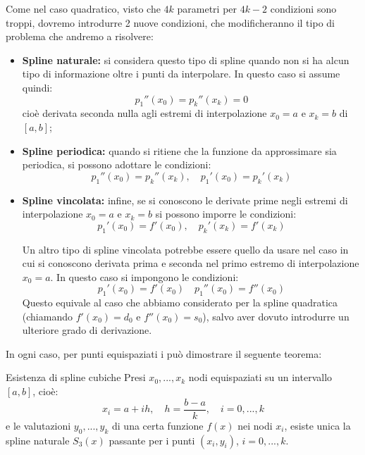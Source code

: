 \documentclass[a4paper,11pt]{article}
\begin{document}
Come nel caso quadratico, visto che $4k$ parametri per $4k - 2$ condizioni sono troppi, dovremo introdurre 2 nuove condizioni, che modificheranno il tipo di problema che andremo a risolvere:
\begin{itemize}
	\item \textbf{Spline naturale:} si considera questo tipo di spline quando non si ha alcun tipo di informazione oltre i punti da interpolare. In questo caso si assume quindi:
		$$
		p_1''(x_0) = p_k''(x_k) = 0
		$$
		cioè derivata seconda nulla agli estremi di interpolazione $x_0 = a$ e $x_k = b$ di $[a, b]$;
	\item \textbf{Spline periodica:} quando si ritiene che la funzione da approssimare sia periodica, si possono adottare le condizioni:
		$$
		p_1''(x_0) = p_k''(x_k), \quad p_1'(x_0) = p_k'(x_k)
		$$
	\item \textbf{Spline vincolata:} infine, se si conoscono le derivate prime negli estremi di interpolazione $x_0 = a$ e $x_k = b$ si possono imporre le condizioni:
		$$
		p_1'(x_0) = f'(x_0), \quad p_k'(x_k) = f'(x_k)
		$$

		Un altro tipo di spline vincolata potrebbe essere quello da usare nel caso in cui si conoscono derivata prima e seconda nel primo estremo di interpolazione $x_0 = a$.
		In questo caso si impongono le condizioni:
		$$
		p_1'(x_0) = f'(x_0) \quad p_1''(x_0) = f''(x_0)
		$$
		Questo equivale al caso che abbiamo considerato per la spline quadratica (chiamando $f'(x_0) = d_0$ e $f''(x_0) = s_0$), salvo aver dovuto introdurre un ulteriore grado di derivazione.
\end{itemize}

In ogni caso, per punti equispaziati i può dimostrare il seguente teorema:
\begin{theorem}{Esistenza di spline cubiche}
	Presi $x_0, ..., x_k$ nodi equispaziati su un intervallo $[a, b]$, cioè:
	$$
	x_i = a + ih, \quad h = \frac{b - a}{k}, \quad i = 0, ..., k
	$$
	e le valutazioni $y_0, ..., y_k$ di una certa funzione $f(x)$ nei nodi $x_i$, esiste unica la spline naturale $S_3(x)$ passante per i punti $(x_i, y_i)$, $i = 0, ..., k$.
\end{theorem}
\end{document}
